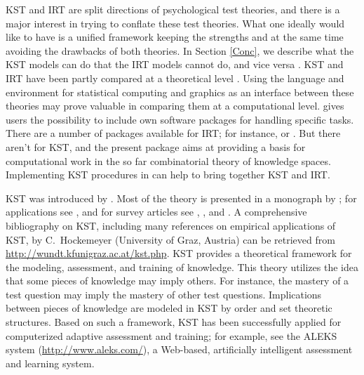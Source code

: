 \documentclass[nojss]{jss}
\begin{document}
KST and IRT are split directions of psychological test theories, and there is 
a major interest in trying to conflate these test theories. 
What one ideally would like to have is a unified framework 
keeping the strengths and at the same time avoiding the drawbacks of both theories.
In Section \ref{Conc}, we describe what the KST models can do that the IRT 
models cannot do, and vice versa \citep[cf.][]{U:07}. 
KST and IRT have been partly compared at a theoretical level \citep{S:06,SR:09,U:06,U:07}. 
Using the  \citep{R:10} 
language and environment for statistical computing and graphics as an interface between these theories may prove valuable in comparing them at a computational level. 
 gives users the possibility to include own software packages 
for handling specific tasks. There are a number of  packages available 
for IRT; for instance,  \citep{ltm} or  \citep{mokken}. But there aren't 
for KST, and the present  package  aims at providing a basis 
for computational work in the so far combinatorial theory of 
knowledge spaces. Implementing KST procedures in  can help to bring together 
KST and IRT.

KST was introduced by \cite{DF:85}. Most of the theory is presented in a monograph by \cite{DF:99}; 
for applications see \cite{AL:99}, and for survey articles see \cite{DF:87}, \cite{F:89b}, and \cite{FKVDJ:90}. A comprehensive bibliography on KST, including many references 
on empirical applications of KST, by C.\ Hockemeyer (University of Graz, Austria) can be 
retrieved from \url{http://wundt.kfunigraz.ac.at/kst.php}.
KST provides a theoretical framework for the modeling, assessment, and training of knowledge. 
This theory utilizes the idea that some pieces of knowledge may imply others. For instance, the mastery of a test question may imply the mastery of other test questions.
Implications between pieces of knowledge are modeled in KST by order and set theoretic structures. Based on such a framework, KST has been successfully applied for computerized adaptive assessment and training; for example, see the ALEKS system (\url{http://www.aleks.com/}), a Web-based, artificially intelligent assessment and learning system. 
\end{document}
